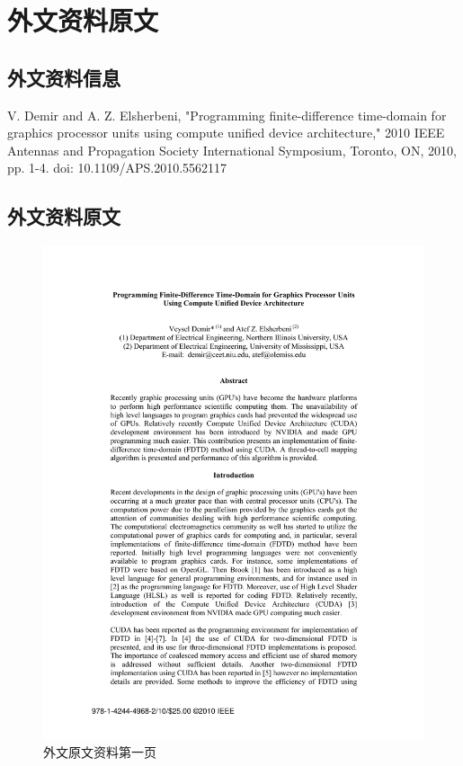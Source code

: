 
\chapter{外文资料原文}

\section{外文资料信息}
V. Demir and A. Z. Elsherbeni, "Programming finite-difference time-domain for graphics processor units using compute unified device architecture," 2010 IEEE Antennas and Propagation Society International Symposium, Toronto, ON, 2010, pp. 1-4. doi: 10.1109/APS.2010.5562117

\section{外文资料原文}

\begin{figure}[h]
\centering
\includegraphics[width=1\linewidth,height=0.8\textheight]{../pics/p01}
\caption{外文原文资料第一页}
\label{fig:p01}
\end{figure}

